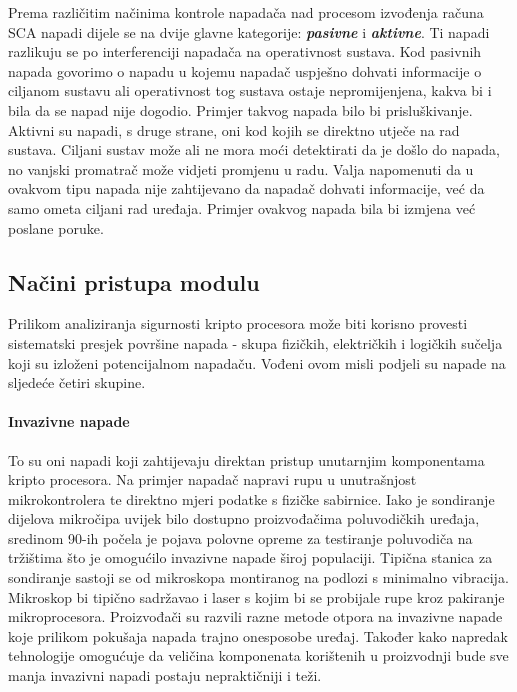\documentclass[times, utf8, diplomski]{fer}
\begin{document}
Prema različitim načinima kontrole napadača nad procesom izvođenja računa SCA napadi dijele se na dvije glavne kategorije: \textit{\textbf{pasivne}} i \textit{\textbf{aktivne}}. Ti napadi razlikuju se po interferenciji napadača na operativnost sustava. Kod pasivnih napada govorimo o napadu u kojemu napadač uspješno dohvati informacije o ciljanom sustavu ali operativnost tog sustava ostaje nepromijenjena, kakva bi i bila da se napad nije dogodio. Primjer takvog napada bilo bi prisluškivanje. Aktivni su napadi, s druge strane, oni kod kojih se direktno utječe na rad sustava. Ciljani sustav može ali ne mora moći detektirati da je došlo do napada, no vanjski promatrač može vidjeti promjenu u radu. Valja napomenuti da u ovakvom tipu napada nije zahtijevano da napadač dohvati informacije, već da samo ometa ciljani rad uređaja. Primjer ovakvog napada bila bi izmjena već poslane poruke.

\subsection{Načini pristupa modulu}

Prilikom analiziranja sigurnosti kripto procesora može biti korisno provesti sistematski presjek površine napada - skupa fizičkih, električkih i logičkih sučelja koji su izloženi potencijalnom napadaču. Vođeni ovom misli \cite{anderson2006cryptographic} podjeli su napade na sljedeće četiri skupine.

\paragraph{Invazivne napade }
To su oni napadi koji zahtijevaju direktan pristup unutarnjim komponentama kripto procesora. Na primjer napadač napravi rupu u unutrašnjost mikrokontrolera te direktno mjeri podatke s fizičke sabirnice. Iako je sondiranje dijelova mikročipa uvijek bilo dostupno proizvođačima poluvodičkih uređaja, sredinom 90-ih počela je pojava polovne opreme za testiranje poluvodiča na tržištima što je omogućilo invazivne napade široj populaciji. Tipična stanica za sondiranje sastoji se od mikroskopa montiranog na podlozi s minimalno vibracija. Mikroskop bi tipično sadržavao i laser s kojim bi se probijale rupe kroz pakiranje mikroprocesora. Proizvođači su razvili razne metode otpora na invazivne napade koje prilikom pokušaja napada trajno onesposobe uređaj. Također kako napredak tehnologije omogućuje da veličina komponenata korištenih u proizvodnji bude sve manja invazivni napadi postaju nepraktičniji i teži.
\end{document}
